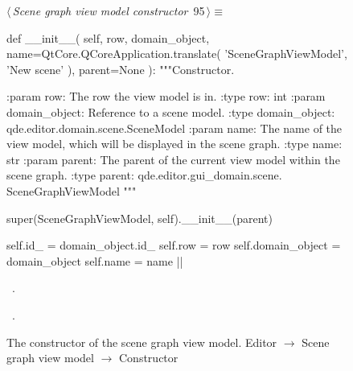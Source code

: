 \documentclass[%
    a4paper,    %
    justified,  %
    nobib,      %
    openany     %
]{tufte-book}
\makeatletter
\renewcommand{\label}[1]{\@tufte@label{##1}}%
\makeatother
\begin{document}
\begin{figure}[!htbp]
\begin{flushleft} \small
\begin{minipage}{\linewidth}\label{scrap24}\raggedright\small
{} $\langle\,${\itshape Scene graph view model constructor}\nobreak\ {\footnotesize {95}}$\,\rangle\equiv$
\vspace{-1ex}
\begin{pythoncode}
def __init__(
        self,
        row,
        domain_object,
        name=QtCore.QCoreApplication.translate(
            'SceneGraphViewModel', 'New scene'
        ),
        parent=None
):
    """Constructor.

    :param row:           The row the view model is in.
    :type  row:           int
    :param domain_object: Reference to a scene model.
    :type  domain_object: qde.editor.domain.scene.SceneModel
    :param name:          The name of the view model, which will
                          be displayed in the scene graph.
    :type  name:          str
    :param parent:        The parent of the current view model
                          within the scene graph.
    :type parent:         qde.editor.gui_domain.scene.
                          SceneGraphViewModel
    """

    super(SceneGraphViewModel, self).__init__(parent)

    self.id_ = domain_object.id_
    self.row  = row
    self.domain_object = domain_object
    self.name = name
|\NWsep|
\end{pythoncode}
\vspace{1.5ex}
\footnotesize
\begin{list}{}{\setlength{\itemsep}{-\parsep}\setlength{\itemindent}{-\leftmargin}}
\item \NWtxtMacroDefBy\ .
\item \NWtxtMacroRefIn\ .

\item{}
\end{list}
\end{minipage}\vspace{4ex}
\end{flushleft}
\caption{The constructor of the scene graph view model.
  \newline{}\newline{}Editor $\rightarrow$ Scene graph view model $\rightarrow$
  Constructor}
\end{figure}
\end{document}
